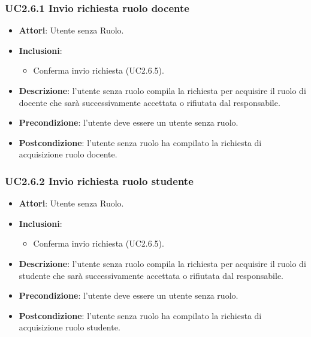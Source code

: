 \subsubsection{UC2.6.1 Invio richiesta ruolo docente}
\begin{itemize}
\item \textbf{Attori}: Utente senza Ruolo.
\item \textbf{Inclusioni}:
\begin{itemize}
\item Conferma invio richiesta (UC2.6.5).
\end{itemize}
\item \textbf{Descrizione}: l'utente senza ruolo compila la richiesta per acquisire il ruolo di docente che sarà successivamente accettata  o rifiutata dal responsabile.
\item \textbf{Precondizione}: l'utente deve essere un utente senza ruolo.
\item \textbf{Postcondizione}: l'utente senza ruolo ha compilato la richiesta di acquisizione ruolo docente.
\end{itemize}
\subsubsection{UC2.6.2 Invio richiesta ruolo studente}
\begin{itemize}
\item \textbf{Attori}: Utente senza Ruolo.
\item \textbf{Inclusioni}:
\begin{itemize}
\item Conferma invio richiesta (UC2.6.5).
\end{itemize}
\item \textbf{Descrizione}: l'utente senza ruolo compila la richiesta per acquisire il ruolo di studente che sarà successivamente accettata o rifiutata dal responsabile.
\item \textbf{Precondizione}: l'utente deve essere un utente senza ruolo.
\item \textbf{Postcondizione}: l'utente senza ruolo ha compilato la richiesta di acquisizione ruolo studente.
\end{itemize}
